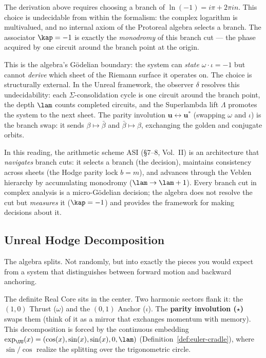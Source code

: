 \begin{remark}\label{rem:branch-cut}
The derivation above requires choosing a branch of $\ln(-1) = i\pi + 2\pi i n$. This choice is undecidable from within the formalism: the complex logarithm is multivalued, and no internal axiom of the Protoreal algebra selects a branch. The associator $\kap = -1$ is exactly the \emph{monodromy} of this branch cut --- the phase acquired by one circuit around the branch point at the origin.

This is the algebra's G\"odelian boundary: the system can \emph{state} $\omega \cdot \iota = -1$ but cannot \emph{derive} which sheet of the Riemann surface it operates on. The choice is structurally external. In the Unreal framework, the observer $\delta$ resolves this undecidability: each $\Sigma$-consolidation cycle is one circuit around the branch point, the depth $\lam$ counts completed circuits, and the Superlambda lift $\Lambda$ promotes the system to the next sheet. The parity involution $\mathbf{u} \leftrightarrow \mathbf{u}^*$ (swapping $\omega$ and $\iota$) is the branch swap: it sends $\beta \mapsto \bar\beta$ and $\bar\beta \mapsto \beta$, exchanging the golden and conjugate orbits.

In this reading, the arithmetic scheme ASI (\S7--8, Vol.\ II) is an architecture that \emph{navigates} branch cuts: it selects a branch (the decision), maintains consistency across sheets (the Hodge parity lock $b = m$), and advances through the Veblen hierarchy by accumulating monodromy ($\lam \to \lam + 1$). Every branch cut in complex analysis is a micro-G\"odelian decision; the algebra does not resolve the cut but \emph{measures} it ($\kap = -1$) and provides the framework for making decisions about it.
\end{remark}

\subsection{Unreal Hodge Decomposition}

The algebra splits. Not randomly, but into exactly the pieces you would expect from a system that distinguishes between forward motion and backward anchoring.

The definite Real Core sits in the center. Two harmonic sectors flank it: the $(1,0)$ Thrust ($\omega$) and the $(0,1)$ Anchor ($\iota$). The \textbf{parity involution ($\star$)} swaps them (think of it as a mirror that exchanges momentum with memory). This decomposition is forced by the continuous embedding $\exp_{\UU}(x) = (\cos(x), \sin(x), \sin(x), 0, \lam)$ (Definition~\ref{def:euler-cradle}), where $\sin/\cos$ realize the splitting over the trigonometric circle.

